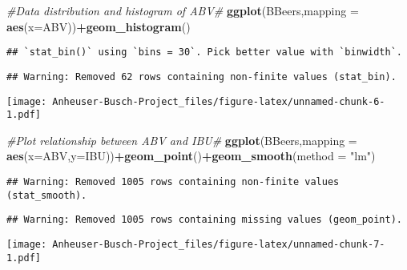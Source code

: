 \documentclass[]{article}
\newenvironment{Shaded}{\begin{snugshade}}{\end{snugshade}}
\newcommand{\CommentTok}[1]{\textcolor[rgb]{0.56,0.35,0.01}{\textit{#1}}}
\newcommand{\DataTypeTok}[1]{\textcolor[rgb]{0.13,0.29,0.53}{#1}}
\newcommand{\KeywordTok}[1]{\textcolor[rgb]{0.13,0.29,0.53}{\textbf{#1}}}
\newcommand{\NormalTok}[1]{#1}
\newcommand{\OperatorTok}[1]{\textcolor[rgb]{0.81,0.36,0.00}{\textbf{#1}}}
\newcommand{\StringTok}[1]{\textcolor[rgb]{0.31,0.60,0.02}{#1}}
\begin{document}
\begin{Shaded}
\begin{Highlighting}[]
\CommentTok{#Data distribution and histogram of ABV#}
\KeywordTok{ggplot}\NormalTok{(BBeers,}\DataTypeTok{mapping =} \KeywordTok{aes}\NormalTok{(}\DataTypeTok{x=}\NormalTok{ABV))}\OperatorTok{+}\KeywordTok{geom_histogram}\NormalTok{()}
\end{Highlighting}
\end{Shaded}

\begin{verbatim}
## `stat_bin()` using `bins = 30`. Pick better value with `binwidth`.
\end{verbatim}

\begin{verbatim}
## Warning: Removed 62 rows containing non-finite values (stat_bin).
\end{verbatim}

\texttt{[image: Anheuser-Busch-Project\_files/figure-latex/unnamed-chunk-6-1.pdf]}

\begin{Shaded}
\begin{Highlighting}[]
\CommentTok{#Plot relationship between ABV and IBU#}
\KeywordTok{ggplot}\NormalTok{(BBeers,}\DataTypeTok{mapping =} \KeywordTok{aes}\NormalTok{(}\DataTypeTok{x=}\NormalTok{ABV,}\DataTypeTok{y=}\NormalTok{IBU))}\OperatorTok{+}\KeywordTok{geom_point}\NormalTok{()}\OperatorTok{+}\KeywordTok{geom_smooth}\NormalTok{(}\DataTypeTok{method =} \StringTok{"lm"}\NormalTok{)}
\end{Highlighting}
\end{Shaded}

\begin{verbatim}
## Warning: Removed 1005 rows containing non-finite values (stat_smooth).
\end{verbatim}

\begin{verbatim}
## Warning: Removed 1005 rows containing missing values (geom_point).
\end{verbatim}

\texttt{[image: Anheuser-Busch-Project\_files/figure-latex/unnamed-chunk-7-1.pdf]}
\end{document}
